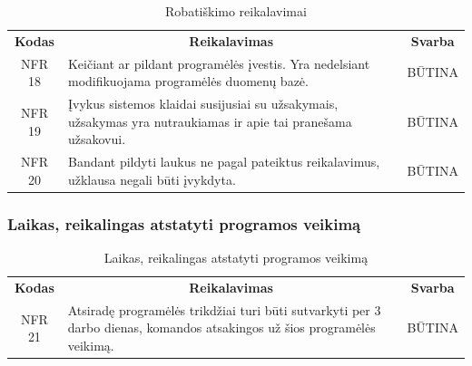 \documentclass{VUMIFPSkursinis}
\begin{document}
{{{{{\begin{center}
	\begin{table}[H]
	\caption{Robatiškimo reikalavimai}
	\begin{tabular}{|p{2cm}|p{}|p{}|}
	\hline
	    \rowcolor{lightgray}
		\multicolumn{3}{|c|}{Robastiškumo reikalavimai}\\
		
	\hline
		\multicolumn{1}{|c|}{{\bfseries Kodas}}&
		\multicolumn{1}{|c|}{{\bfseries Reikalavimas}}&
		\multicolumn{1}{|c|}{{\bfseries Svarba}}\\
	\hline 	
		\multicolumn{1}{|c|}{NFR 18}&
		{Keičiant ar pildant programėlės įvestis. Yra nedelsiant modifikuojama programėlės duomenų bazė.}&
		\multicolumn{1}{|c|}{BŪTINA}\\
		
	\hline 	
		\multicolumn{1}{|c|}{NFR 19}&
		{Įvykus sistemos klaidai susijusiai su užsakymais, užsakymas yra nutraukiamas ir apie tai pranešama užsakovui.}&
		\multicolumn{1}{|c|}{BŪTINA}\\
		
	\hline 	
		\multicolumn{1}{|c|}{NFR 20}&
		{Bandant pildyti laukus ne pagal pateiktus reikalavimus, užklausa negali būti įvykdyta.}&
		\multicolumn{1}{|c|}{BŪTINA}\\
		
	\hline
	
	
	\end{tabular}
	
	\label{table:Robastiškumoreikalavimai}
	\end{table}

\end{center}


\subsubsection{Laikas, reikalingas atstatyti programos veikimą}
\begin{center}
	\begin{table}[H]
	\caption{Laikas, reikalingas atstatyti programos veikimą}
	\begin{tabular}{|p{2cm}|p{}|p{}|}
	\hline
	    \rowcolor{lightgray}
		\multicolumn{3}{|c|}{Laikas, reikalingas atstatyti programos veikimą}\\
		
	\hline
		\multicolumn{1}{|c|}{{\bfseries Kodas}}&
		\multicolumn{1}{|c|}{{\bfseries Reikalavimas}}&
		\multicolumn{1}{|c|}{{\bfseries Svarba}}\\
	\hline 	
		\multicolumn{1}{|c|}{NFR 21}&
		{Atsiradę programėlės trikdžiai turi būti sutvarkyti per 3 darbo dienas, komandos atsakingos už šios programėlės veikimą.}&
		\multicolumn{1}{|c|}{BŪTINA}\\		
	\hline
	

\end{tabular}
\end{table}
\end{center}}}}}}
\end{document}
